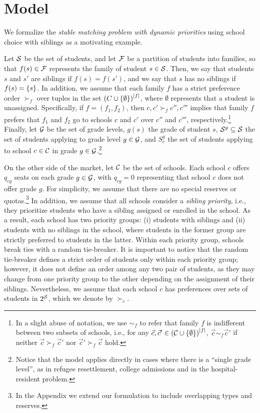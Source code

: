 
\section{Model}\label{sec: model}

    We formalize the \emph{stable matching problem with dynamic priorities} using school choice with siblings as a motivating example.

    Let \(\mathcal{S}\) be the set of students, and let \(\mathcal{F}\) be a partition of students into families, so that \(f(s) \in \mathcal{F}\) represents the family of student \(s\in \mathcal{S}\). Then, we say that students \(s\) and \(s'\) are siblings if \(f(s) = f(s')\), and we say that \(s\) has no siblings if \(f(s) = \left\{s\right\}\).  In addition, we assume that each family \(f\) has a strict preference order \(\succ_f\) over tuples in the set \(\left(C\cup\left\{\emptyset\right\}\right)^{\left|f\right|}\), where \(\emptyset\) represents that a student is unassigned. Specifically, if \(f = (f_1, f_2)\), then \(c,c' \succ_f c'', c'''\) implies that family \(f\) prefers that \(f_1\) and \(f_2\) go to schools \(c\) and \(c'\) over \(c''\) and \(c'''\), respectively.\footnote{In a slight abuse of notation, we use \(\sim_f\) to refer that family \(f\) is indifferent between two subsets of schools, i.e., for any \(\vec{c}, \vec{c}' \in \left(\mathcal{C} \cup \left\{\emptyset\right\}\right)^{\left|f\right|}\), \(\vec{c} \sim_f \vec{c}'\) if neither \(\vec{c}\succ_f \vec{c}'\) nor \(\vec{c}'\succ_f \vec{c}\) hold.}
    Finally, let \(\mathcal{G}\) be the set of grade levels, \(g(s)\) the grade of student \(s\), \(\mathcal{S}^{g} \subseteq \mathcal{S}\) the set of students applying to grade level \(g\in \mathcal{G}\), and \(S^g_c\) the set of students applying to school \(c\in \mathcal{C}\) in grade \(g\in \mathcal{G}\).\footnote{Notice that the model applies directly in cases where there is a ``single grade level'', as in refugee resettlement, college admissions and in the hospital-resident problem.}

    On the other side of the market, let \(\mathcal{C}\) be the set of schools. Each school \(c\) offers \(q_{cg}\) seats on each grade \(g\in \mathcal{G}\), with \(q_{cg} = 0\) representing that school \(c\) does not offer grade \(g\). For simplicity, we assume that there are no special reserves or quotas.\footnote{In the Appendix we extend our formulation to include overlapping types and reserves.} In addition, we assume that all schools consider a \emph{sibling priority}, i.e., they prioritize students who have a sibling assigned or enrolled in the school. As a result, each school has two priority groups: (i) students with siblings and (ii) students with no siblings in the school, where students in the former group are strictly preferred to students in the latter. Within each priority group, schools break ties with a random tie-breaker. It is important to notice that the random tie-breaker defines a strict order of students only within each priority group; however, it does not define an order among any two pair of students, as they may change from one priority group to the other depending on the assignment of their siblings. Nevertheless, we assume that each school \(c\) has preferences over sets of students in \(2^{\mathcal{S}}\), which we denote by \(\succ_c\).

